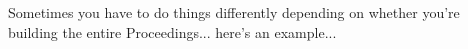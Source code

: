 
Sometimes you have to do things differently depending on whether
you're building the entire Proceedings... here's an example...

\ifols
\usepackage{cprog}
\usepackage[nolineno,norules]{lgrind}
\usepackage[hang,scriptsize]{subfigure}
\else
\usepackage{subfigure}
\usepackage{listings}
\fi

